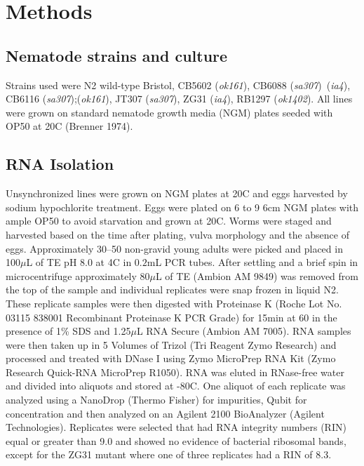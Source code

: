 \section*{Methods}
\label{sec:methods}
\subsection*{Nematode strains and culture}
Strains used were N2 wild-type Bristol,
CB5602 (\emph{ok161}),
CB6088 (\emph{sa307})~(\emph{ia4}),
CB6116 (\emph{sa307});(\emph{ok161}),
JT307 (\emph{sa307}),
ZG31 (\emph{ia4}),
RB1297 (\emph{ok1402}).
All lines were grown on standard
nematode growth media (NGM) plates seeded with OP50 \ecol{} at 20\degree{}C
(Brenner 1974).

\subsection*{RNA Isolation}
Unsynchronized lines were grown on NGM plates at 20C and eggs harvested by
sodium hypochlorite treatment. Eggs were plated on 6 to 9 6cm NGM plates
with ample OP50 \ecol{} to avoid starvation and grown at
20\degree{}C.  Worms were staged and harvested based on the time after plating,
vulva morphology and the absence of eggs.  Approximately 30--50 non-gravid young
adults were picked and placed in 100$\mu$L of TE pH 8.0 at 4\degree{}C in
$0.2$mL PCR tubes.   After settling and a brief spin in microcentrifuge
approximately $80\mu$L of TE (Ambion AM 9849) was removed from the top of the
sample and individual replicates
were snap frozen in liquid N2. These replicate samples were then digested with
Proteinase K (Roche Lot No. 03115 838001 Recombinant Proteinase K PCR Grade) for
15min at 60\degree{} in the presence of 1\% SDS and 1.25$\mu$L
RNA Secure (Ambion AM 7005). RNA samples were then taken up in 5 Volumes of
Trizol (Tri Reagent Zymo Research) and processed and treated with DNase I using
Zymo MicroPrep RNA Kit (Zymo Research Quick-RNA MicroPrep R1050).
RNA was eluted in RNase-free water and divided into aliquots and stored at
-80\degree{}C. One aliquot of each replicate was analyzed using a NanoDrop (Thermo
Fisher) for impurities, Qubit for concentration and then analyzed on an Agilent
2100 BioAnalyzer (Agilent Technologies).
Replicates were selected that had RNA integrity numbers (RIN) equal or greater
than 9.0 and showed no evidence of bacterial ribosomal bands, except for the
ZG31 mutant where one of three replicates had a RIN of 8.3.

